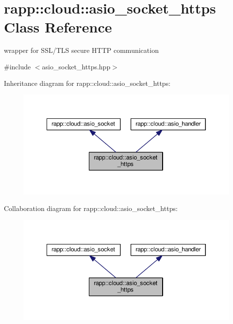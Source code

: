 \hypertarget{classrapp_1_1cloud_1_1asio__socket__https}{\section{rapp\-:\-:cloud\-:\-:asio\-\_\-socket\-\_\-https Class Reference}
\label{classrapp_1_1cloud_1_1asio__socket__https}
}


wrapper for S\-S\-L/\-T\-L\-S secure H\-T\-T\-P communication  




{\ttfamily \#include $<$asio\-\_\-socket\-\_\-https.\-hpp$>$}



Inheritance diagram for rapp\-:\-:cloud\-:\-:asio\-\_\-socket\-\_\-https\-:
\nopagebreak
\begin{figure}[H]
\begin{center}
\leavevmode
\includegraphics[width=345pt]{classrapp_1_1cloud_1_1asio__socket__https__inherit__graph}
\end{center}
\end{figure}


Collaboration diagram for rapp\-:\-:cloud\-:\-:asio\-\_\-socket\-\_\-https\-:
\nopagebreak
\begin{figure}[H]
\begin{center}
\leavevmode
\includegraphics[width=345pt]{classrapp_1_1cloud_1_1asio__socket__https__coll__graph}
\end{center}
\end{figure}
